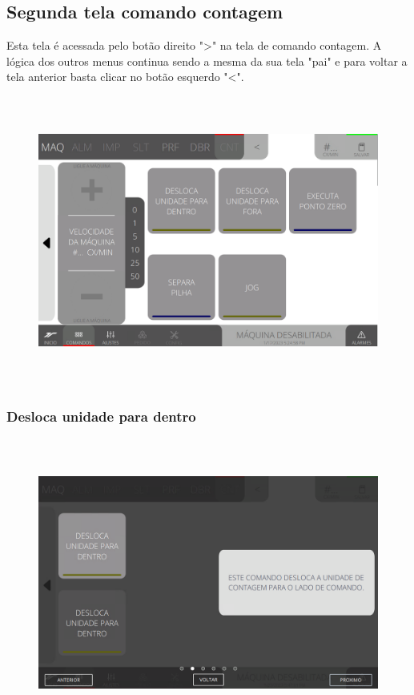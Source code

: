 \newpage
\thispagestyle{fancy}
\vspace*{40 pt}
\subsection{Segunda tela comando contagem}
Esta tela é acessada pelo botão direito "\textgreater" na tela de comando contagem. A lógica dos outros menus continua sendo a mesma da sua tela "pai" e para voltar a tela anterior basta clicar no botão esquerdo "\textless{}".
\vspace*{\fill}
\begin{figure}[h]
  \centering
  \includegraphics[width=576px,height=360px]{src/imagesFlexo/08-count/commands/e-Tela-Principal-2.png}
\end{figure}

\newpage
\thispagestyle{fancy}
\vspace*{40 pt}
\subsubsection{\small{Desloca unidade para dentro}}
\vspace*{\fill}
\begin{figure}[h]
  \centering
  \includegraphics[width=576px,height=360px]{src/imagesFlexo/08-count/commands/e-9.png}
\end{figure}
\vspace*{\fill}

